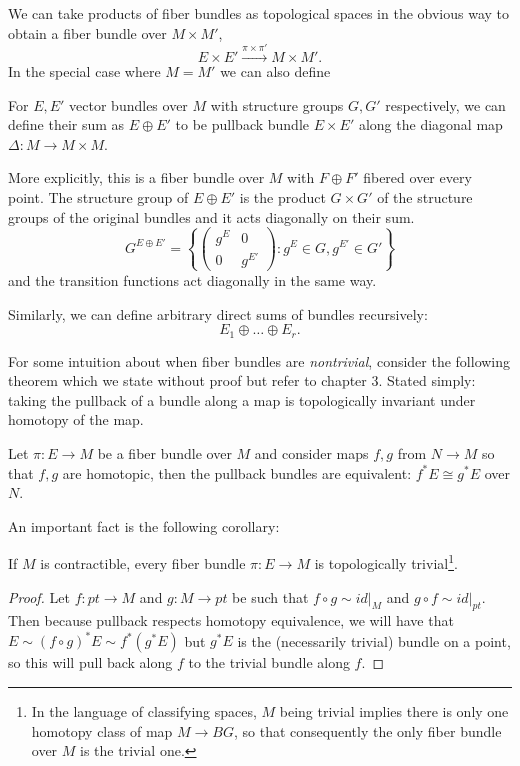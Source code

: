 		We can take products of fiber bundles as topological spaces in the obvious way to obtain a fiber bundle over $M \times M'$,
		\[
			E \times E' \xrightarrow{\pi \times \pi'} M \times M'.
		\]
		In the special case where $M = M'$ we can also define 
		\begin{defn}
			For $E, E'$ vector bundles over $M$ with structure groups $G, G'$ respectively, we can define their sum as $E \oplus E'$ to be pullback bundle $E \times E'$ along the diagonal map $\Delta: M \rightarrow M \times M$.
			
			More explicitly, this is a fiber bundle over $M$ with $F \oplus F'$ fibered over every point. 
			The structure group of $E \oplus E'$ is the product $G \times G'$ of the structure groups of the original bundles and it acts diagonally on their sum.
			\[
				G^{E \oplus E'} = \left \{ \begin{pmatrix}
					g^E & 0 \\
					0 & g^{E'}
				\end{pmatrix} : g^E \in G, g^{E'} \in G' \right \}
			\]
			and the transition functions act diagonally in the same way. 
		\end{defn}
		Similarly, we can define arbitrary direct sums of bundles recursively:
		\[
			E_1 \oplus \dots \oplus E_r.
		\]
		
		For some intuition about when fiber bundles are \emph{nontrivial}, consider the following theorem which we state without proof but refer to \cite{bott1982} chapter 3. Stated simply: taking the pullback of a bundle along a map is topologically invariant under homotopy of the map. 
		\begin{theorem}
			Let $\pi:E \rightarrow M$ be a fiber bundle over $M$ and consider maps $f, g$ from $N \rightarrow M$ so that $f, g$ are homotopic, then the pullback bundles are equivalent: $f^* E \cong g^* E$ over $N$.
		\end{theorem}
		An important fact is the following corollary:
		\begin{cor}
			If $M$ is contractible, every fiber bundle $\pi: E \rightarrow M$ is topologically trivial\footnote{In the language of classifying spaces, $M$ being trivial implies there is only one homotopy class of map $M \to BG$, so that consequently the only fiber bundle over $M$ is the trivial one.}.
		\end{cor}
		\begin{proof}
			Let $f: pt \to M$ and $g: M \to pt$ be such that $f \circ g \sim id|_M$ and $g \circ f \sim id|_{pt}$. Then because pullback respects homotopy equivalence, we will have that $E \sim (f \circ g)^* E \sim f^* (g^*E)$ but $g^* E$ is the (necessarily trivial) bundle on a point, so this will pull back along $f$ to the trivial bundle along $f$.
		\end{proof}
		
